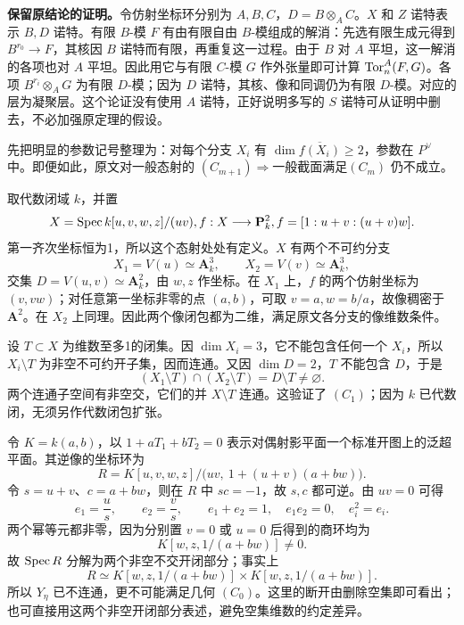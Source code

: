 \textbf{保留原结论的证明。}令仿射坐标环分别为 $A,B,C$，$D=B\otimes_AC$。$X$ 和 $Z$ 诺特表示 $B,D$ 诺特。有限 $B$-模 $F$ 有由有限自由 $B$-模组成的解消：先选有限生成元得到 $B^{r_0}\to F$，其核因 $B$ 诺特而有限，再重复这一过程。由于 $B$ 对 $A$ 平坦，这一解消的各项也对 $A$ 平坦。因此用它与有限 $C$-模 $G$ 作外张量即可计算 $\operatorname{Tor}^A_n(F,G)$。各项 $B^{r_i}\otimes_AG$ 为有限 $D$-模；因为 $D$ 诺特，其核、像和同调仍为有限 $D$-模。对应的层为凝聚层。这个论证没有使用 $A$ 诺特，正好说明多写的 $S$ 诺特可从证明中删去，不必加强原定理的假设。

先把明显的参数记号整理为：对每个分支 $X_i$ 有 $\dim\overline{f(X_i)}\geq2$，参数在 $P^\vee$ 中。即便如此，原文对一般态射的 $(C_{m+1})\Rightarrow$一般截面满足$(C_m)$ 仍不成立。

取代数闭域 $k$，并置
\[
 X=\operatorname{Spec} k[u,v,w,z]/(uv),
 f:X\longrightarrow\mathbf P^2_k,
  f=[1:u+v:(u+v)w].
\]
第一齐次坐标恒为1，所以这个态射处处有定义。$X$ 有两个不可约分支
\[
 X_1=V(u)\simeq\mathbf A^3_k,
 \qquad X_2=V(v)\simeq\mathbf A^3_k,
\]
交集 $D=V(u,v)\simeq\mathbf A^2_k$，由 $w,z$ 作坐标。在 $X_1$ 上，$f$ 的两个仿射坐标为 $(v,vw)$；对任意第一坐标非零的点 $(a,b)$，可取 $v=a,w=b/a$，故像稠密于 $\mathbf A^2$。在 $X_2$ 上同理。因此两个像闭包都为二维，满足原文各分支的像维数条件。

设 $T\subset X$ 为维数至多1的闭集。因 $\dim X_i=3$，它不能包含任何一个 $X_i$，所以 $X_i\setminus T$ 为非空不可约开子集，因而连通。又因 $\dim D=2$，$T$ 不能包含 $D$，于是
\[
 (X_1\setminus T)\cap(X_2\setminus T)=D\setminus T\ne\varnothing.
\]
两个连通子空间有非空交，它们的并 $X\setminus T$ 连通。这验证了 $(C_1)$；因为 $k$ 已代数闭，无须另作代数闭包扩张。

令 $K=k(a,b)$，以 $1+aT_1+bT_2=0$ 表示对偶射影平面一个标准开图上的泛超平面。其逆像的坐标环为
\[
 R=K[u,v,w,z]/\bigl(uv,\ 1+(u+v)(a+bw)\bigr).
\]
令 $s=u+v$、$c=a+bw$，则在 $R$ 中 $sc=-1$，故 $s,c$ 都可逆。由 $uv=0$ 可得
\[
 e_1=\frac{u}{s},\qquad e_2=\frac{v}{s},\qquad
 e_1+e_2=1,
 \quad e_1e_2=0,
 \quad e_i^2=e_i.
\]
两个幂等元都非零，因为分别置 $v=0$ 或 $u=0$ 后得到的商环均为
\[
 K[w,z,1/(a+bw)]\ne0.
\]
故 $\operatorname{Spec} R$ 分解为两个非空不交开闭部分；事实上
\[
 R\simeq K[w,z,1/(a+bw)]\times K[w,z,1/(a+bw)].
\]
所以 $Y_\eta$ 已不连通，更不可能满足几何 $(C_0)$。这里的断开由删除空集即可看出；也可直接用这两个非空开闭部分表述，避免空集维数的约定差异。

